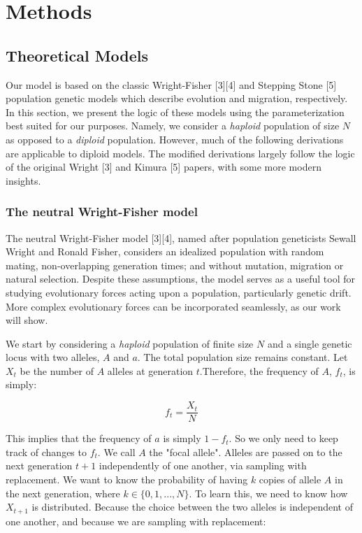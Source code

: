 \chapter{Methods}

\section{Theoretical Models}

Our model is based on the classic Wright-Fisher [3][4] and Stepping Stone [5] population genetic models which describe evolution and migration, respectively. In this section, we present the logic of these models using the parameterization best suited for our purposes. Namely, we consider a \textit{haploid} population of size $N$ as opposed to a \textit{diploid} population. However, much of the following derivations are applicable to diploid models. The modified derivations largely follow the logic of the original Wright [3] and Kimura [5] papers, with some more modern insights.\cite{Rackauckas2014AnII}\cite{tran_2012} \cite{durret_2008}


\subsection{The neutral Wright-Fisher model}

The neutral Wright-Fisher model [3][4], named after population geneticists Sewall Wright and Ronald Fisher, considers an idealized population with random mating, non-overlapping generation times; and without mutation, migration or natural selection. Despite these assumptions, the model serves as a useful tool for studying evolutionary forces acting upon a population, particularly genetic drift. More complex evolutionary forces can be incorporated seamlessly, as our work will show. 


We start by considering a \textit{haploid} population of finite size $N$ and a single genetic locus with two alleles, $A$ and $a$. The total population size remains constant. Let $X_t$ be the number of $A$ alleles at generation $t$.Therefore, the frequency of $A$, $f_t$, is simply:

\begin{equation}
    f_t = \frac{X_t}{N}
\end{equation}

This implies that the frequency of $a$ is simply $1-f_t$. So we only need to keep track of changes to $f_t$. We call $A$ the "focal allele". Alleles are passed on to the next generation $t+1$ independently of one another, via sampling with replacement. We want to know the probability of having $k$ copies of allele $A$ in the next generation, where $k \in \{0,1,...,N\}$. To learn this, we need to know how $X_{t+1}$ is distributed. Because the choice between the two alleles is independent of one another, and because we are sampling with replacement:


